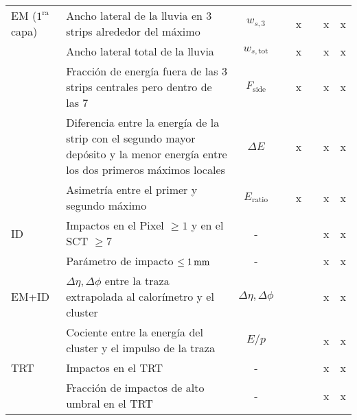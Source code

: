 \begin{table}[!htbp]
\begin{tabular}{l p{7cm} c | cc | ccc}
  EM ($1^\mathrm{ra}$ capa) & Ancho lateral de la lluvia en 3 strips alrededor
                  del máximo                                        & $w_{s,3}$               &   & x &   & x & x \\

                & Ancho lateral total de la lluvia                  & $w_{s,\mathrm{tot}}$    &   & x &   & x & x \\

                & Fracción de energía fuera de las 3 strips
                  centrales pero dentro de las 7                    & $F_{\mathrm{side}}$     &   & x &   & x & x \\

                & Diferencia entre la energía de la strip con el
                  segundo mayor depósito y la menor energía entre
                  los dos primeros máximos locales                  & $\Delta E$              &   & x &   & x & x \\

                & Asimetría entre el primer y segundo máximo        & $E_{\mathrm{ratio}}$    &   & x &   & x & x \\


  ID            & Impactos en el Pixel $\geq 1$ y en el
                  SCT $\geq 7$                                      & -                       &   &   &   & x & x \\

                & Parámetro de impacto $\leq \unit[1]{mm}$          & -                       &   &   &   & x & x \\


  EM+ID         & $\Delta\eta,\Delta\phi$ entre la traza
                  extrapolada al calorímetro y el cluster           & $\Delta\eta,\Delta\phi$ &  &   &   & x & x \\

                & Cociente entre la energía del cluster y el impulso
                  de la traza                                       & $E/p$                   &  &   &   & x & x \\


  TRT           & Impactos en el TRT                                & -                       &  &   &   & x & x \\

                & Fracción de impactos de alto umbral en el TRT     & -                       &  &   &   & x & x \\
  \hline
  \end{tabular}

\end{table}


